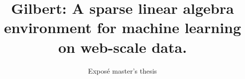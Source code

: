 \documentclass{dima}
\begin{document}

\title{Gilbert: A sparse linear algebra environment for machine learning on web-scale data.}
\subtitle{Exposé master's thesis}


%
%
%
%


\author{
%
%
}
\end{document}
